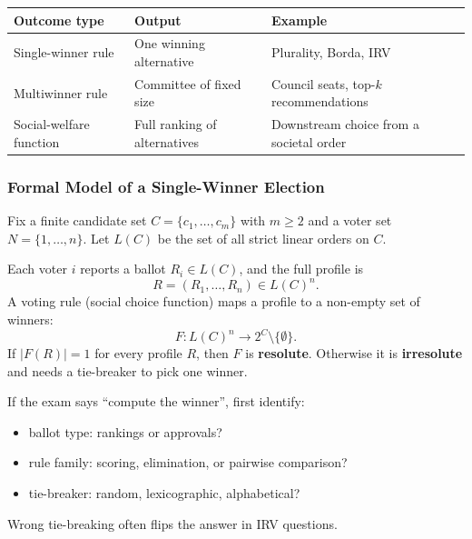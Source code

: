 \begin{center}
\renewcommand{\arraystretch}{1.25}
\begin{tabular}{@{}p{3.2cm}p{3.8cm}p{5.3cm}@{}}
\toprule
\textbf{Outcome type} & \textbf{Output} & \textbf{Example} \\
\midrule
Single-winner rule & One winning alternative & Plurality, Borda, IRV \\
Multiwinner rule & Committee of fixed size & Council seats, top-$k$ recommendations \\
Social-welfare function & Full ranking of alternatives & Downstream choice from a societal order \\
\bottomrule
\end{tabular}
\end{center}

\separator

\subsubsection{Formal Model of a Single-Winner Election}

\begin{defbox}
Fix a finite candidate set $C = \{c_1,\ldots,c_m\}$ with $m \geq 2$ and a voter set $N = \{1,\ldots,n\}$. Let $L(C)$ be the set of all strict linear orders on $C$.

Each voter $i$ reports a ballot $R_i \in L(C)$, and the full profile is
\[
  R = (R_1,\ldots,R_n) \in L(C)^n.
\]
A voting rule (social choice function) maps a profile to a non-empty set of winners:
\[
  F : L(C)^n \to 2^C \setminus \{\emptyset\}.
\]
If $|F(R)| = 1$ for every profile $R$, then $F$ is \textbf{resolute}. Otherwise it is \textbf{irresolute} and needs a tie-breaker to pick one winner.
\end{defbox}

\begin{tipbox}
If the exam says ``compute the winner'', first identify:
\begin{itemize}
  \item ballot type: rankings or approvals?
  \item rule family: scoring, elimination, or pairwise comparison?
  \item tie-breaker: random, lexicographic, alphabetical?
\end{itemize}
Wrong tie-breaking often flips the answer in IRV questions.
\end{tipbox}

